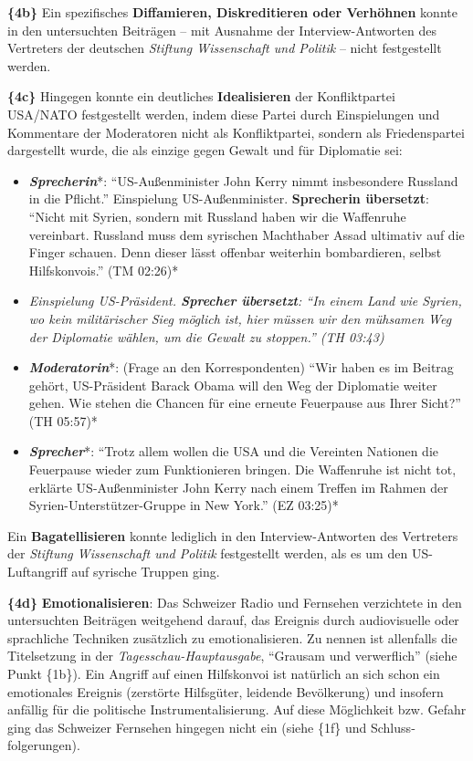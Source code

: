 \textbf{\{4b\}} Ein spezifisches \textbf{Diffamieren, Diskreditieren
oder Verhöhnen} konnte in den untersuchten Beiträgen -- mit Ausnahme der
Interview-Antworten des Vertreters der deutschen \emph{Stiftung
Wissenschaft und Politik} -- nicht festgestellt werden.

\textbf{\{4c\}} Hingegen konnte ein deutliches \textbf{Idealisieren} der
Konfliktpartei USA/NATO festgestellt werden, indem diese Partei durch
Einspielungen und Kommentare der Moderatoren nicht als Konfliktpartei,
sondern als Friedenspartei dargestellt wurde, die als einzige gegen
Gewalt und für Diplomatie sei:

\begin{itemize}
\tightlist
\item
  \emph{\textbf{Sprecherin}}*: ``US-Außenminister John Kerry nimmt
  insbesondere Russland in die Pflicht.'' Einspielung US-Außen­minister.
  \textbf{Sprecherin übersetzt}: ``Nicht mit Syrien, sondern mit
  Russland haben wir die Waffenruhe vereinbart. Russland muss dem
  syrischen Machthaber Assad ultimativ auf die Finger schauen. Denn
  dieser lässt offenbar weiterhin bombardieren, selbst Hilfskonvois.''
  (TM 02:26)*
\item
  \emph{Einspielung US-Präsident. \textbf{Sprecher übersetzt}: ``In
  einem Land wie Syrien, wo kein militärischer Sieg möglich ist, hier
  müssen wir den mühsamen Weg der Diplomatie wählen, um die Gewalt zu
  stoppen.'' (TH 03:43)}
\item
  \emph{\textbf{Moderatorin}}*: (Frage an den Korrespondenten) ``Wir
  haben es im Beitrag gehört, US-Präsident Barack Obama will den Weg der
  Diplomatie weiter gehen. Wie stehen die Chancen für eine erneute
  Feuerpause aus Ihrer Sicht?'' (TH 05:57)*
\item
  \emph{\textbf{Sprecher}}*: ``Trotz allem wollen die USA und die
  Vereinten Nationen die Feuerpause wieder zum Funktionieren bringen.
  Die Waffenruhe ist nicht tot, erklärte US-Außenminister John Kerry
  nach einem Treffen im Rahmen der Syrien-Unterstützer-Gruppe in New
  York.'' (EZ 03:25)*
\end{itemize}

Ein \textbf{Bagatellisieren} konnte lediglich in den Interview-Antworten
des Vertreters der \emph{Stiftung Wissenschaft und Politik} festgestellt
werden, als es um den US-Luftangriff auf syrische Truppen ging.

\textbf{\{4d\}} \textbf{Emotionalisieren}: Das Schweizer Radio und
Fernsehen verzichtete in den untersuchten Beiträgen weitgehend darauf,
das Ereignis durch audiovisuelle oder sprachliche Techniken zusätzlich
zu emotionalisieren. Zu nennen ist allenfalls die Titelsetzung in der
\emph{Tagesschau-Hauptausgabe}, ``Grausam und verwerflich'' (siehe Punkt
\{1b\}). Ein Angriff auf einen Hilfskonvoi ist natürlich an sich schon
ein emotionales Ereignis (zerstörte Hilfsgüter, leidende Bevölkerung)
und insofern anfällig für die politische Instrumenta­lisierung. Auf
diese Möglichkeit bzw. Gefahr ging das Schweizer Fernsehen hingegen
nicht ein (siehe \{1f\} und Schluss­folgerungen).


